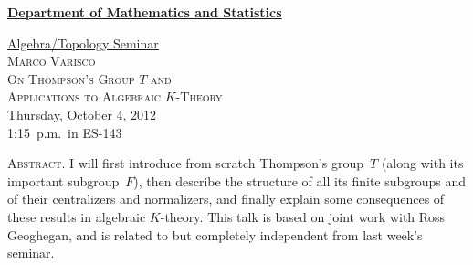 \documentclass[12pt]{article}
\begin{document}
\noindent\hspace{-28pt}\raisebox{-19pt}{\XeTeXpicfile UAlogo.jpg scaled 340}%
\hfill\textsf{\textbf{\footnotesize\href{http://www.albany.edu/math/}{Department of Mathematics and Statistics}}}\bigskip\bigskip

\begin{center}\Large
  \textsf{\huge \href{http://www.albany.edu/~mv312143/seminar/}{Algebra/Topology Seminar}}\\[2.5\bigskipamount]
  \textsc{\LARGE Marco Varisco}\\[1.5\bigskipamount]
  \textsc{\LARGE On Thompson's Group $T$ and\\ Applications to Algebraic $K$-Theory}\\[2\bigskipamount]
  Thursday, October 4, 2012\\1:15~p.m.\ in ES-143\\[3\bigskipamount]
\end{center}

\noindent\large\textsc{Abstract.}
I will first introduce from scratch Thompson's group~$T$ (along with its important subgroup~$F$), then describe the structure of all its finite subgroups and of their centralizers and normalizers, and finally explain some consequences of these results in algebraic $K$-theory.
This talk is based on joint work with Ross Geoghegan, and is related to but completely independent from last week's seminar.
\end{document}
